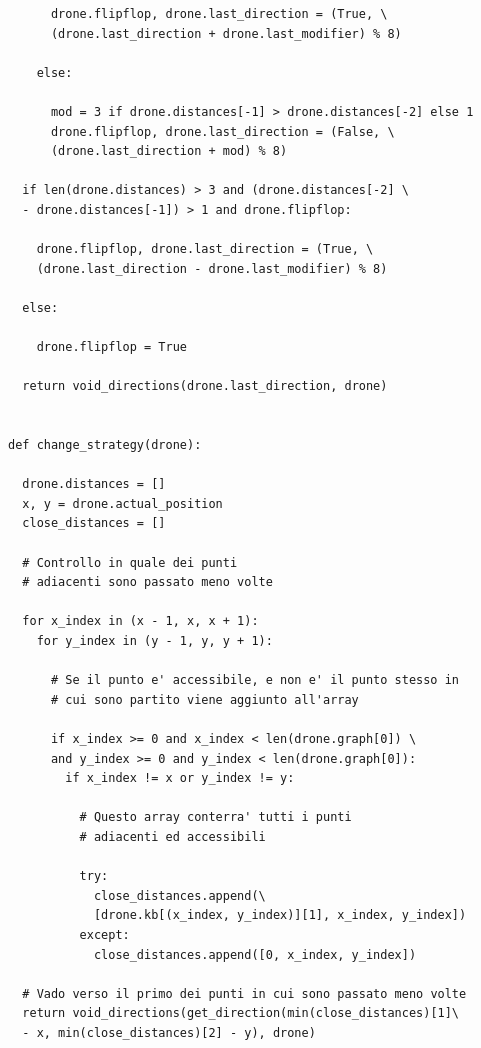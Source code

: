 \begin{verbatim}
      drone.flipflop, drone.last_direction = (True, \
      (drone.last_direction + drone.last_modifier) % 8)

    else:

      mod = 3 if drone.distances[-1] > drone.distances[-2] else 1
      drone.flipflop, drone.last_direction = (False, \
      (drone.last_direction + mod) % 8)

  if len(drone.distances) > 3 and (drone.distances[-2] \
  - drone.distances[-1]) > 1 and drone.flipflop:

    drone.flipflop, drone.last_direction = (True, \
    (drone.last_direction - drone.last_modifier) % 8)

  else:

    drone.flipflop = True

  return void_directions(drone.last_direction, drone)


def change_strategy(drone):

  drone.distances = []
  x, y = drone.actual_position
  close_distances = []

  # Controllo in quale dei punti 
  # adiacenti sono passato meno volte

  for x_index in (x - 1, x, x + 1):
    for y_index in (y - 1, y, y + 1):

      # Se il punto e' accessibile, e non e' il punto stesso in 
      # cui sono partito viene aggiunto all'array

      if x_index >= 0 and x_index < len(drone.graph[0]) \
      and y_index >= 0 and y_index < len(drone.graph[0]):
        if x_index != x or y_index != y:

          # Questo array conterra' tutti i punti 
          # adiacenti ed accessibili

          try:
            close_distances.append(\
            [drone.kb[(x_index, y_index)][1], x_index, y_index])
          except:
            close_distances.append([0, x_index, y_index])

  # Vado verso il primo dei punti in cui sono passato meno volte
  return void_directions(get_direction(min(close_distances)[1]\
  - x, min(close_distances)[2] - y), drone)

\end{verbatim}


